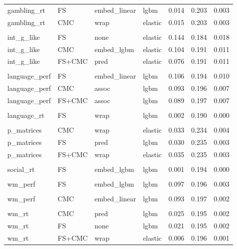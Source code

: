 \documentclass{article}
\begin{document}
\begin{longtable}{llllrrr}
		gambling\_rt & FS & embed\_linear & lgbm & 0.014 & 0.203 & 0.003 \\*
		gambling\_rt & CMC & wrap & elastic & 0.015 & 0.203 & 0.003 \\*
		\\*
		int\_g\_like & FS & none & elastic & 0.144 & 0.184 & 0.018 \\*
		int\_g\_like & CMC & embed\_lgbm & elastic & 0.104 & 0.191 & 0.011 \\*
		int\_g\_like & FS+CMC & pred & elastic & 0.076 & 0.191 & 0.011 \\*
		\\*
		language\_perf & FS & embed\_linear & lgbm & 0.106 & 0.194 & 0.010 \\*
		language\_perf & CMC & assoc & lgbm & 0.093 & 0.196 & 0.007 \\*
		language\_perf & FS+CMC & assoc & lgbm & 0.089 & 0.197 & 0.007 \\*
		\\*
		language\_rt & FS & wrap & lgbm & 0.002 & 0.190 & 0.000 \\*
		\\*
		p\_matrices & CMC & wrap & elastic & 0.033 & 0.234 & 0.004 \\*
		p\_matrices & FS & pred & lgbm & 0.030 & 0.235 & 0.003 \\*
		p\_matrices & FS+CMC & wrap & elastic & 0.035 & 0.235 & 0.003 \\*
		\\*
		social\_rt & FS & embed\_lgbm & lgbm & 0.001 & 0.194 & 0.000 \\*
		\\*
		wm\_perf & FS & embed\_lgbm & lgbm & 0.097 & 0.196 & 0.003 \\*
		\\*
		wm\_perf & CMC & embed\_linear & lgbm & 0.093 & 0.197 & 0.002 \\*
		\\*
		wm\_rt & CMC & pred & lgbm & 0.025 & 0.195 & 0.002 \\*
		wm\_rt & FS & none & lgbm & 0.021 & 0.195 & 0.002 \\*
		wm\_rt & FS+CMC & wrap & elastic & 0.006 & 0.196 & 0.001 \\*
\end{longtable}



\end{document}
